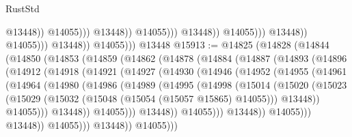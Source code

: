 \begin{lexlean}{RustStd}
\begin{coremodule}
                                                      @13448))
                                                  @14055)))
                                            @13448))
                                        @14055)))
                                  @13448))
                              @14055)))
                        @13448))
                    @14055)))
              @13448))
          @14055)))
    @13448
@15913 := @14825
    (@14828
      (@14844
        (@14850
          (@14853
            (@14859
              (@14862
                (@14878
                  (@14884
                    (@14887
                      (@14893
                        (@14896
                          (@14912
                            (@14918
                              (@14921
                                (@14927
                                  (@14930
                                    (@14946
                                      (@14952
                                        (@14955
                                          (@14961
                                            (@14964
                                              (@14980
                                                (@14986
                                                  (@14989
                                                    (@14995
                                                      (@14998
                                                        (@15014
                                                          (@15020
                                                            (@15023
                                                              (@15029
                                                                (@15032
                                                                  (@15048
                                                                    (@15054
                                                                      (@15057 @15865)
                                                                      @14055)))
                                                                @13448))
                                                            @14055)))
                                                      @13448))
                                                  @14055)))
                                            @13448))
                                        @14055)))
                                  @13448))
                              @14055)))
                        @13448))
                    @14055)))
              @13448))
          @14055)))

\end{coremodule}
\end{lexlean}
